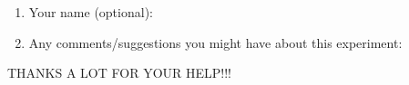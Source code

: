 \documentclass{article}
\title{}
\author{Debugging experiment - Exit survey for population 1}
\date{July 30, 2003}
\begin{document}
\maketitle
\begin{flushleft}
\vspace{0.5in}

\thispagestyle{empty}


\begin{enumerate}
\item{Your name (optional):}
\item{Any comments/suggestions you might have about this experiment:}
\end{enumerate}


\vspace{3in}
\begin{center}
THANKS A LOT FOR YOUR HELP!!!
\end{center}

\end{flushleft}
\end{document}
